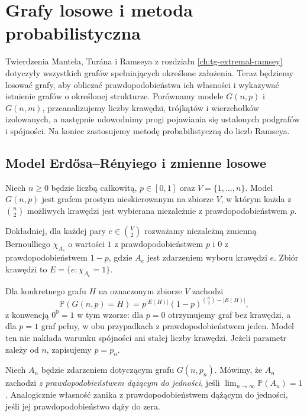 \chapter{Grafy losowe i metoda probabilistyczna}
\label{ch:tg-random-graphs}

Twierdzenia Mantela, Turána i Ramseya z rozdziału
\ref{ch:tg-extremal-ramsey} dotyczyły wszystkich grafów
spełniających określone założenia. Teraz będziemy
losować grafy, aby obliczać prawdopodobieństwa ich
własności i wykazywać istnienie grafów
o określonej strukturze. Porównamy modele $G(n,p)$ i $G(n,m)$, przeanalizujemy
liczby krawędzi, trójkątów i wierzchołków izolowanych,
a następnie udowodnimy progi pojawiania się ustalonych
podgrafów i spójności. Na koniec zastosujemy metodę
probabilistyczną do liczb Ramseya.

\section{Model Erdősa--Rényiego i zmienne losowe}
\label{sec:tg-random-model}

\begin{definicja}
\label{def:tg-random-gnp}
Niech $n\geq0$ będzie liczbą całkowitą,
$p\in[0,1]$ oraz
$V=\{1,\ldots,n\}$. Model $G(n,p)$
jest grafem prostym nieskierowanym
na zbiorze $V$, w którym każda
z $\binom n2$ możliwych krawędzi
jest wybierana niezależnie
z prawdopodobieństwem $p$.

Dokładniej, dla każdej pary
$e\in\binom V2$ rozważamy niezależną
zmienną Bernoulliego $\chi_{A_e}$ o wartości
$1$ z prawdopodobieństwem
$p$ i $0$ z prawdopodobieństwem
$1-p$, gdzie $A_e$ jest zdarzeniem wyboru
krawędzi $e$. Zbiór krawędzi to
$E=\{e:\chi_{A_e}=1\}$.
\end{definicja}

Dla konkretnego grafu $H$ na
oznaczonym zbiorze $V$ zachodzi
\[
\mathbb P(G(n,p)=H)
=p^{|E(H)|}(1-p)^{\binom n2-|E(H)|},
\]
z konwencją $0^0=1$ w tym wzorze:
dla $p=0$ otrzymujemy graf bez krawędzi,
a dla $p=1$ graf pełny, w obu przypadkach
z prawdopodobieństwem jeden. Model ten
nie nakłada warunku spójności
ani stałej liczby krawędzi.
Jeżeli parametr zależy od $n$,
zapisujemy $p=p_n$.

\begin{definicja}
\label{def:tg-random-whp}
Niech $A_n$ będzie zdarzeniem
dotyczącym grafu $G(n,p_n)$.
Mówimy, że $A_n$ zachodzi
\emph{z prawdopodobieństwem
dążącym do jedności}, jeśli
$\lim_{n\to\infty}\mathbb P(A_n)=1$.
Analogicznie własność zanika
z prawdopodobieństwem dążącym
do jedności, jeśli jej
prawdopodobieństwo dąży do zera.
\end{definicja}

